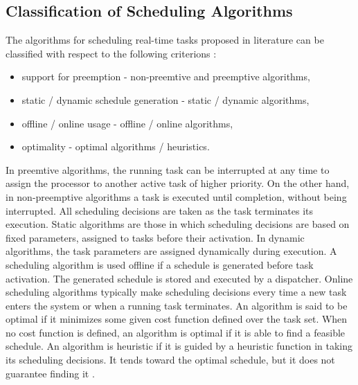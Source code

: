 \subsection{Classification of Scheduling Algorithms}
The algorithms for scheduling real-time tasks proposed in literature can be classified with respect to the following criterions \cite{buttazzo2011hard}:
\begin{itemize}
    \item support for preemption - non-preemtive and preemptive algorithms, 
    \item static / dynamic schedule generation - static / dynamic algorithms,
    \item offline / online usage - offline / online algorithms,
    \item optimality - optimal algorithms / heuristics.
\end{itemize}
In preemtive algorithms, the running task can be interrupted at any time to assign the processor to another active task of higher priority.
On the other hand, in non-preemptive algorithms a task is executed until completion, without being interrupted. 
All scheduling decisions are taken as the task terminates its execution.
Static algorithms are those in which scheduling decisions are based on fixed parameters, assigned to tasks before their activation.
In dynamic algorithms, the task parameters are assigned dynamically during execution.
A scheduling algorithm is used offline if a schedule is generated before task activation. 
The generated schedule is stored and executed by a dispatcher.
Online scheduling algorithms typically make scheduling decisions every time a new task enters the system or when a running task terminates.
An algorithm is said to be optimal if it minimizes some given cost function defined over the task set. 
When no cost function is defined, an algorithm is optimal if it is able to find a feasible schedule.
An algorithm is heuristic if it is guided by a heuristic function in taking its scheduling decisions. 
It tends toward the optimal schedule, but it does not guarantee finding it \cite{buttazzo2011hard}.

